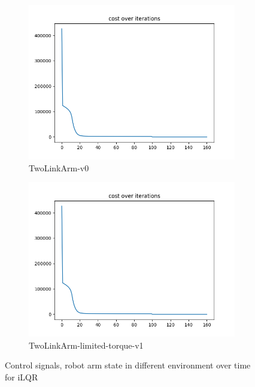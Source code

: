 \documentclass[hidelinks]{scrartcl}
\begin{document}
\begin{figure}[H]
	\centering
    \begin{subfigure}[b]{0.45\textwidth}
        \includegraphics[width=\textwidth]{figures/ilqr2-cost1}
        \caption{TwoLinkArm-v0}
    \end{subfigure}
    \begin{subfigure}[b]{0.45\textwidth}
        \includegraphics[width=\textwidth]{figures/ilqr2-cost2}
        \caption{TwoLinkArm-limited-torque-v1}
    \end{subfigure}
    \caption{Control signals, robot arm state in different environment over time for iLQR}\label{fig:iLQR_state}
\end{figure}
\end{document}
